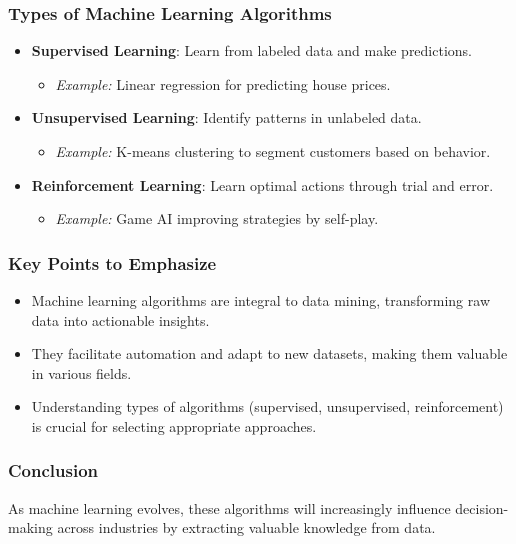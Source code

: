 \documentclass[aspectratio=169]{beamer}
\begin{document}
\begin{frame}[fragile]
    \frametitle{Types of Machine Learning Algorithms}
    \begin{itemize}
        \item \textbf{Supervised Learning}: Learn from labeled data and make predictions.
        \begin{itemize}
            \item \textit{Example:} Linear regression for predicting house prices.
        \end{itemize}
        
        \item \textbf{Unsupervised Learning}: Identify patterns in unlabeled data.
        \begin{itemize}
            \item \textit{Example:} K-means clustering to segment customers based on behavior.
        \end{itemize}
        
        \item \textbf{Reinforcement Learning}: Learn optimal actions through trial and error.
        \begin{itemize}
            \item \textit{Example:} Game AI improving strategies by self-play.
        \end{itemize}
    \end{itemize}
\end{frame}

\begin{frame}[fragile]
    \frametitle{Key Points to Emphasize}
    \begin{itemize}
        \item Machine learning algorithms are integral to data mining, transforming raw data into actionable insights.
        \item They facilitate automation and adapt to new datasets, making them valuable in various fields.
        \item Understanding types of algorithms (supervised, unsupervised, reinforcement) is crucial for selecting appropriate approaches.
    \end{itemize}
\end{frame}

\begin{frame}[fragile]
    \frametitle{Conclusion}
    As machine learning evolves, these algorithms will increasingly influence decision-making across industries by extracting valuable knowledge from data.
\end{frame}
\end{document}
